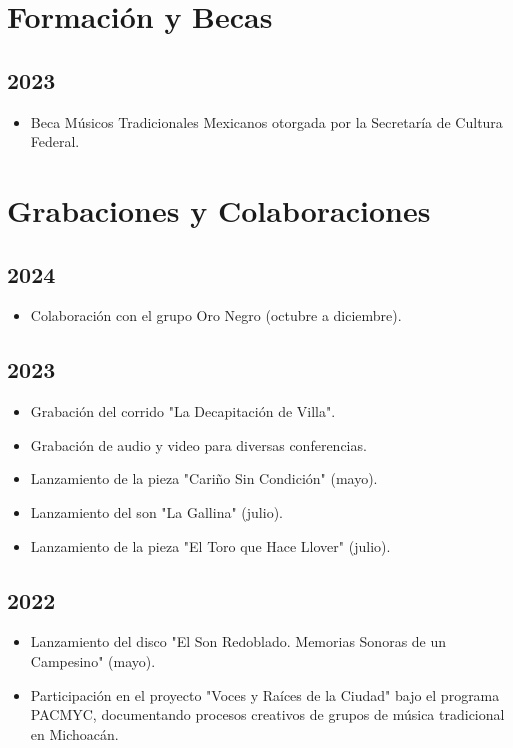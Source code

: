 \documentclass{article}
\begin{document}
\section*{Formación y Becas}

\subsection*{2023}
\begin{itemize}[leftmargin=*]
    \item Beca Músicos Tradicionales Mexicanos otorgada por la Secretaría de Cultura Federal.
\end{itemize}


\section*{Grabaciones y Colaboraciones}

\subsection*{2024}
\begin{itemize}[leftmargin=*]
    \item Colaboración con el grupo Oro Negro (octubre a diciembre).
\end{itemize}

\subsection*{2023}
\begin{itemize}[leftmargin=*]
    \item Grabación del corrido "La Decapitación de Villa".
    \item Grabación de audio y video para diversas conferencias.
    \item Lanzamiento de la pieza "Cariño Sin Condición" (mayo).
    \item Lanzamiento del son "La Gallina" (julio).
    \item Lanzamiento de la pieza "El Toro que Hace Llover" (julio).
\end{itemize}

\subsection*{2022}
\begin{itemize}[leftmargin=*]
    \item Lanzamiento del disco "El Son Redoblado. Memorias Sonoras de un Campesino" (mayo).
    \item Participación en el proyecto "Voces y Raíces de la Ciudad" bajo el programa PACMYC, documentando procesos creativos de grupos de música tradicional en Michoacán.
\end{itemize}
\end{document}
